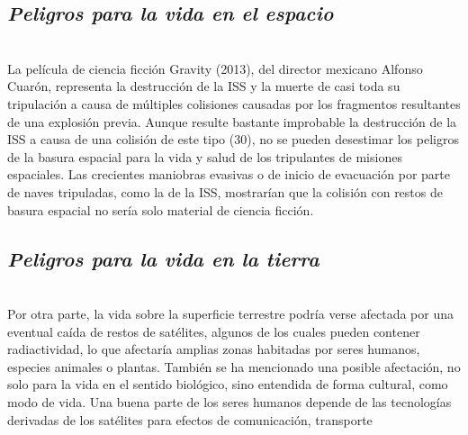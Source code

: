 \documentclass[12pt,letterpaper]{article}
\begin{document}
\begin{multicols}{2}
\subsection*{\normalsize{{\textit{Peligros para la vida en el espacio}}}}\\
\noindent La película de ciencia ficción Gravity (2013), del director mexicano Alfonso Cuarón, representa la destrucción de
la ISS y la muerte de casi toda su tripulación a causa
de múltiples colisiones causadas por los fragmentos
resultantes de una explosión previa. Aunque resulte
bastante improbable la destrucción de la ISS a causa de
una colisión de este tipo (30), no se pueden desestimar
los peligros de la basura espacial para la vida y salud de
los tripulantes de misiones espaciales. Las crecientes
maniobras evasivas o de inicio de evacuación por parte
de naves tripuladas, como la de la ISS, mostrarían que
la colisión con restos de basura espacial no sería solo
material de ciencia ficción. 
\subsection*{\normalsize{{\textit{Peligros para la vida en la tierra}}}}\\
\noindent Por otra parte, la vida sobre la superficie terrestre
podría verse afectada por una eventual caída de restos
de satélites, algunos de los cuales pueden contener
radiactividad, lo que afectaría amplias zonas habitadas
por seres humanos, especies animales o plantas. También
se ha mencionado una posible afectación, no solo para
la vida en el sentido biológico, sino entendida de forma
cultural, como modo de vida. Una buena parte de los
seres humanos depende de las tecnologías derivadas de
los satélites para efectos de comunicación, transporte
\end{multicols}
\newpage

\end{document}
